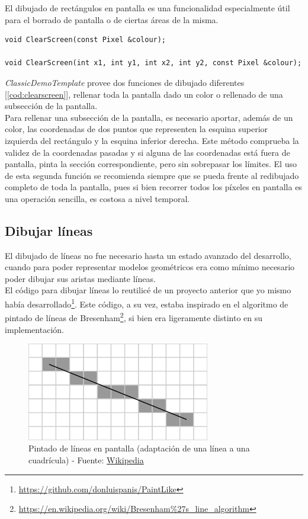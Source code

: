 El dibujado de rectángulos en pantalla es una funcionalidad especialmente útil para el borrado de pantalla o de ciertas áreas de la misma.\\

\begin{lstlisting}[style=C-color, caption={Métodos de repintado en pantalla},label=cod:clearscreen]
void ClearScreen(const Pixel &colour);

void ClearScreen(int x1, int y1, int x2, int y2, const Pixel &colour);
\end{lstlisting}

\emph{ClassicDemoTemplate} provee dos funciones de dibujado diferentes [\ref{cod:clearscreen}], rellenar toda la pantalla dado un color o rellenado de una subsección de la pantalla.\\

Para rellenar una subsección de la pantalla, es necesario aportar, además de un color, las coordenadas de dos puntos que representen la esquina superior izquierda del rectángulo y la esquina inferior derecha. Este método comprueba la validez de la coordenadas pasadas y si alguna de las coordenadas está fuera de pantalla, pinta la sección correspondiente, pero sin sobrepasar los límites. El uso de esta segunda función se recomienda siempre que se pueda frente al redibujado completo de toda la pantalla, pues si bien recorrer todos los píxeles en pantalla es una operación sencilla, es costosa a nivel temporal.

\subsection{Dibujar líneas}

El dibujado de líneas no fue necesario hasta un estado avanzado del desarrollo, cuando para poder representar modelos geométricos era como mínimo necesario poder dibujar sus aristas mediante líneas.\\

El código para dibujar líneas lo reutilicé de un proyecto anterior que yo mismo había desarrollado\footnote{\url{https://github.com/donluispanis/PaintLike}}. Este código, a su vez, estaba inspirado en el algoritmo de pintado de líneas de Bresenham\footnote{\url{https://en.wikipedia.org/wiki/Bresenham\%27s_line_algorithm}}, si bien era ligeramente distinto en su implementación. 

\begin{figure}[h]
	\centering
	\includegraphics[width=8cm]{archivos/bresenham}
	\caption{Pintado de líneas en pantalla (adaptación de una línea a una cuadrícula) - Fuente: \href{https://en.wikipedia.org/wiki/Bresenham\%27s_line_algorithm\#/media/File:Bresenham.svg}{Wikipedia}}
	\label{fig:bresenham}
\end{figure}

